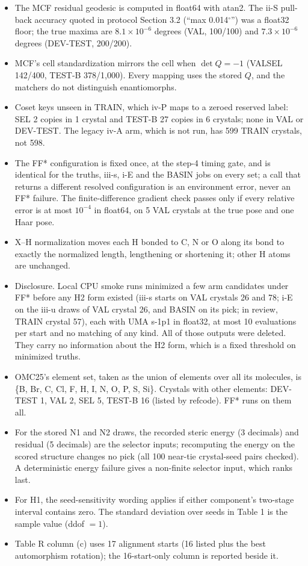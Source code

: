 \begin{itemize}
\item The MCF residual geodesic is computed in float64 with atan2. The ii-S
pull-back accuracy quoted in protocol Section 3.2 (``max 0.014$^\circ$'') was a
float32 floor; the true maxima are $8.1\times10^{-6}$ degrees (VAL, 100/100) and
$7.3\times10^{-6}$ degrees (DEV-TEST, 200/200).
\item MCF's cell standardization mirrors the cell when $\det Q=-1$ (VALSEL 142/400,
TEST-B 378/1,000). Every mapping uses the stored $Q$, and the matchers do not
distinguish enantiomorphs.
\item Coset keys unseen in TRAIN, which iv-P maps to a zeroed reserved label: SEL 2
copies in 1 crystal and TEST-B 27 copies in 6 crystals; none in VAL or DEV-TEST.
The legacy iv-A arm, which is not run, has 599 TRAIN crystals, not 598.
\item The FF* configuration is fixed once, at the step-4 timing gate, and is
identical for the truths, iii-s, i-E and the BASIN jobs on every set; a call that
returns a different resolved configuration is an environment error, never an FF*
failure. The finite-difference gradient check passes only if every relative error
is at most $10^{-4}$ in float64, on 5 VAL crystals at the true pose and one Haar
pose.
\item X--H normalization moves each H bonded to C, N or O along its bond to exactly
the normalized length, lengthening or shortening it; other H atoms are unchanged.
\item Disclosure. Local CPU smoke runs minimized a few arm candidates under FF*
before any H2 form existed (iii-s starts on VAL crystals 26 and 78; i-E on the
iii-u draws of VAL crystal 26, and BASIN on its pick; in review, TRAIN crystal 57),
each with UMA s-1p1 in float32, at most 10 evaluations per start and no matching
of any kind. All of those outputs were deleted. They carry no information about the
H2 form, which is a fixed threshold on minimized truths.
\item OMC25's element set, taken as the union of elements over all its molecules,
is \{B, Br, C, Cl, F, H, I, N, O, P, S, Si\}. Crystals with other elements: DEV-TEST
1, VAL 2, SEL 5, TEST-B 16 (listed by refcode). FF* runs on them all.
\item For the stored N1 and N2 draws, the recorded steric energy (3 decimals) and
residual (5 decimals) are the selector inputs; recomputing the energy on the scored
structure changes no pick (all 100 near-tie crystal-seed pairs checked). A
deterministic energy failure gives a non-finite selector input, which ranks last.
\item For H1, the seed-sensitivity wording applies if either component's two-stage
interval contains zero. The standard deviation over seeds in Table 1 is the sample
value (ddof $=1$).
\item Table R column (c) uses 17 alignment starts (16 listed plus the best
automorphism rotation); the 16-start-only column is reported beside it.
\end{itemize}

